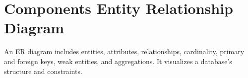\section{Components Entity Relationship Diagram}
An ER diagram includes entities, attributes, relationships, cardinality, primary and foreign keys, weak entities, and aggregations. It visualizes a database's structure and constraints.

